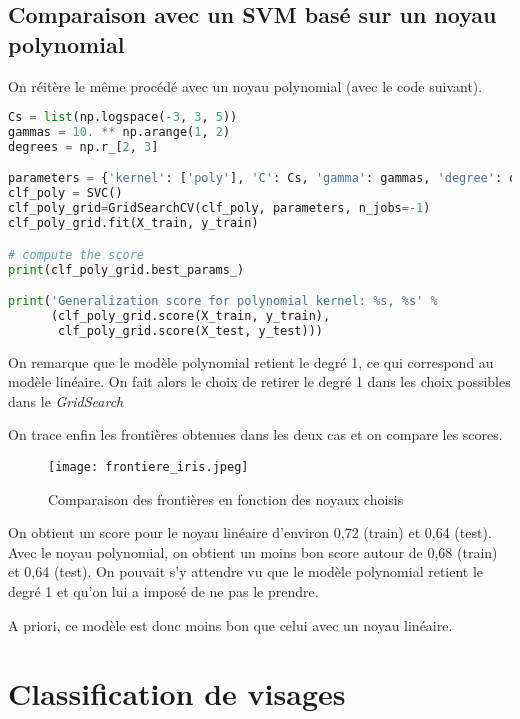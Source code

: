 \documentclass[a4paper, 12pt]{article}
\begin{document}
\subsection{Comparaison avec un SVM basé sur un noyau polynomial}\label{subsec:comparaison}

On réitère le même procédé avec un noyau polynomial (avec le code suivant). 

\begin{lstlisting}[language=Python, caption=Classification avec noyau polynomial]
Cs = list(np.logspace(-3, 3, 5))
gammas = 10. ** np.arange(1, 2)
degrees = np.r_[2, 3]

parameters = {'kernel': ['poly'], 'C': Cs, 'gamma': gammas, 'degree': degrees}
clf_poly = SVC()
clf_poly_grid=GridSearchCV(clf_poly, parameters, n_jobs=-1)
clf_poly_grid.fit(X_train, y_train)

# compute the score
print(clf_poly_grid.best_params_)

print('Generalization score for polynomial kernel: %s, %s' %
      (clf_poly_grid.score(X_train, y_train),
       clf_poly_grid.score(X_test, y_test)))
\end{lstlisting}

On remarque que le modèle polynomial retient le degré 1, ce qui correspond au modèle linéaire. On fait alors le choix de retirer le degré 1 dans les choix possibles dans le \textit{GridSearch}

\newpage
On trace enfin les frontières obtenues dans les deux cas et on compare les scores. 

\begin{figure}[h!]
    \centering
    \texttt{[image: frontiere\_iris.jpeg]}
    \caption{Comparaison des frontières en fonction des noyaux choisis}
    \label{fig:ellipses.png}
\end{figure}

On obtient un score pour le noyau linéaire d'environ 0,72 (train) et 0,64 (test). Avec le noyau polynomial, on obtient un moins bon score autour de 0,68 (train) et 0,64 (test). On pouvait s'y attendre vu que le modèle polynomial retient le degré 1 et qu'on lui a imposé de ne pas le prendre. 

A priori, ce modèle est donc moins bon que celui avec un noyau linéaire. 


\newpage
\section{Classification de visages} \label{sec:clavis}
\end{document}
